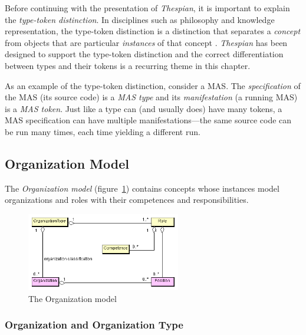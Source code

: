 Before continuing with the presentation of \textit{Thespian}, it is important to explain the \textit{type-token distinction}.
In disciplines such as philosophy and knowledge representation, the type-token distinction is a distinction that separates a \textit{concept} from objects that are particular \textit{instances} of that concept \cite{Wikipedia-TTD}.
\textit{Thespian} has been designed to support the type-token distinction and the correct differentiation between types and their tokens is a recurring theme in this chapter.

As an example of the type-token distinction, consider a MAS.
The \textit{specification} of the MAS (its source code) is a \textit{MAS type} and its \textit{manifestation} (a running MAS) is a \textit{MAS token}.
Just like a type can (and usually does) have many tokens, a MAS specification can have multiple manifestations---the same source code can be run many times, each time yielding a different run.

\subsection{Organization Model}

The \textit{Organization model} (figure~\ref{figure:thespian-organization-model}) contains concepts whose instances model organizations and roles with their competences and responsibilities.

\begin{figure}[ht]
	\centering
	\includegraphics[width=0.6\textwidth]{images/thespian/organization-model.png}
	\caption{The Organization model}
	\label{figure:thespian-organization-model}
\end{figure}

\subsubsection*{Organization and Organization Type}

